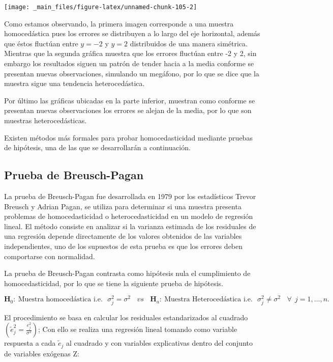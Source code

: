 \documentclass[
  a4paper,
  oneside,
  openany]{book}
\begin{document}
\begin{center}\texttt{[image: \_main\_files/figure-latex/unnamed-chunk-105-2]} \end{center}

Como estamos observando, la primera imagen corresponde a una muestra homocedástica pues los errores se distribuyen a lo largo del eje horizontal, además que éstos fluctúan entre \(y=-2\) y \(y=2\) distribuidos de una manera simétrica. Mientras que la segunda gráfica muestra que los errores fluctúan entre -2 y 2, sin embargo los resultados siguen un patrón de tender hacia a la media conforme se presentan nuevas observaciones, simulando un megáfono, por lo que se dice que la muestra sigue una tendencia heterocedástica.

Por último las gráficas ubicadas en la parte inferior, muestran como conforme se presentan nuevas observaciones los errores se alejan de la media, por lo que son muestras heterocedásticas.

Existen métodos más formales para probar homocedasticidad mediante pruebas de hipótesis, una de las que se desarrollarán a continuación.

\hypertarget{prueba-de-breusch-pagan}{%
\subsection{Prueba de Breusch-Pagan}\label{prueba-de-breusch-pagan}}

La prueba de Breusch-Pagan fue desarrollada en 1979 por los estadísticos Trevor Breusch y Adrian Pagan, se utiliza para determinar si una muestra presenta problemas de homocedasticidad o heterocedasticidad en un modelo de regresión lineal. El método consiste en analizar si la varianza estimada de los residuales de una regresión depende directamente de los valores obtenidos de las variables independientes, uno de los supuestos de esta prueba es que los errores deben comportarse con normalidad.

La prueba de Breusch-Pagan contrasta como hipótesis nula el cumplimiento de homocedasticidad, por lo que se tiene la siguiente prueba de hipótesis.

\[\textbf{H}_0: \ \mbox{Muestra homocedástica  i.e.} \ \ \ \sigma^2_{j}=\sigma^2 \ \ \ \ vs  \ \ \ \
\textbf{H}_a:  \ \mbox{Muestra Heterocedástica  i.e.} \ \ \ \sigma^2_{j} \neq \sigma^2 \ \ \ \ \forall  \ \ j = 1,\ldots,n.\]

El procedimiento se basa en calcular los residuales estandarizados al cuadrado \(\left( \tilde{e}^2_{j}=\frac{e^2_{j}}{\sigma^2}\right)\); Con ello se realiza una regresión lineal tomando como variable respuesta a cada \(\tilde{e}_{j}\) al cuadrado y con variables explicativas dentro del conjunto de variables exógenas Z:
\end{document}
